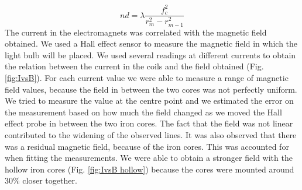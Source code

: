 \documentclass[11pt]{article}
\begin{document}
\begin{equation}
    nd = \lambda \frac{f_c^2}{r_m^2-r_{m-1}^2} \label{eq: d}
\end{equation}
The current in the electromagnets was correlated with the magnetic field obtained. We used a Hall effect sensor to measure the magnetic field in which the light bulb will be placed. We used several readings at different currents to obtain the relation between the current in the coils and the field obtained (Fig. \ref{fig:IvsB}). For each current value we were able to measure a range of magnetic field values, because the field in between the two cores was not perfectly uniform. We tried to measure the value at the centre point and we estimated the error on the measurement based on how much the field changed as we moved the Hall effect probe in between the two iron cores. The fact that the field was not linear contributed to the widening of the observed lines. It was also observed that there was a residual magnetic field, because of the iron cores. This was accounted for when fitting the measurements. We were able to obtain a stronger field with the hollow iron cores (Fig. \ref{fig:IvsB hollow}) because the cores were mounted around $30\%$ closer together.
\end{document}
